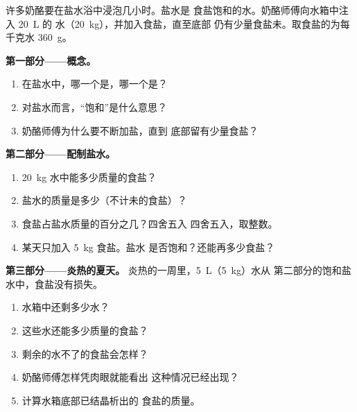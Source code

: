 \begin{problem}
\label{pb:g6:solutions-and-solubility:1}
许多奶酪要在盐水浴中浸泡几小时。盐水是
食盐饱和的水。奶酪师傅向水箱中注入 \qty{20}{L} 的
水（\qty{20}{kg}），并加入食盐，直至底部
仍有少量食盐未。取食盐的为每千克水
\qty{360}{g}。

\medskip
\noindent\textbf{第一部分——概念。}
\begin{enumerate}
  \item 在盐水中，哪一个是，哪一个是？
  \item 对盐水而言，“饱和”是什么意思？
  \item 奶酪师傅为什么要不断加盐，直到
        底部留有少量食盐？
\end{enumerate}

\medskip
\noindent\textbf{第二部分——配制盐水。}
\begin{enumerate}[resume]
  \item \qty{20}{kg} 水中能多少质量的食盐？
  \item 盐水的质量是多少（不计未的食盐）？
  \item 食盐占盐水质量的百分之几？四舍五入
        四舍五入，取整数。
  \item 某天只加入 \qty{5}{kg} 食盐。盐水
        是否饱和？还能再多少食盐？
\end{enumerate}

\medskip
\noindent\textbf{第三部分——炎热的夏天。}
炎热的一周里，\qty{5}{L}（\qty{5}{kg}）水从
第二部分的饱和盐水中，食盐没有损失。
\begin{enumerate}[resume]
  \item 水箱中还剩多少水？
  \item 这些水还能多少质量的食盐？
  \item 剩余的水不了的食盐会怎样？
  \item 奶酪师傅怎样凭肉眼就能看出
        这种情况已经出现？
  \item 计算水箱底部已结晶析出的
        食盐的质量。
\end{enumerate}
\end{problem}
